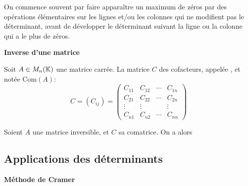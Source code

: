 \documentclass[10pt,class=article,crop=false]{standalone}
\begin{document}
\begin{multicols}{2}
On commence souvent par faire apparaître
un maximum de zéros par des opérations élémentaires sur les lignes et/ou les colonnes
qui ne modifient pas le déterminant,
avant de développer le déterminant suivant la ligne ou la colonne qui a le plus de zéros.

\textbf{Inverse d'une matrice}

Soit $A \in M_n(\mathbb{K})$ une matrice carrée.
La matrice $C$ des cofacteurs, appelée , et notée
$\mathrm{Com}(A)$:
$$C = (C_{ij}) = \left(
\begin{array}{cccc}
	C_{11} & C_{12} & \cdots & C_{1n}\\
	C_{21} & C_{22} & \cdots & C_{2n}\\
	\vdots & \vdots & & \vdots\\
	C_{n1} & C_{n2} & \cdots & C_{nn}
\end{array}\right)
$$

\begin{theoreme}
	Soient $A$ une matrice inversible, et $C$ sa comatrice.
	On a alors
\end{theoreme}





\subsection{Applications des déterminants}



\textbf{Méthode de Cramer}



\end{multicols}
\end{document}
